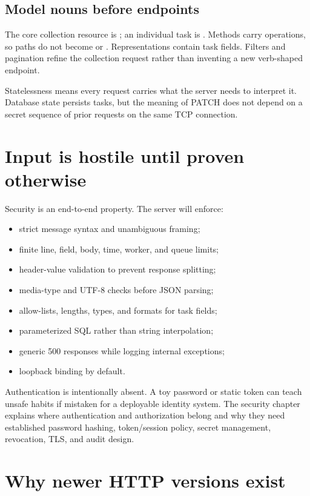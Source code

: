 \subsection{Model nouns before endpoints}

The core collection resource is ; an individual task is
. Methods carry operations, so paths do not become
 or . Representations contain task fields.
Filters and pagination refine the collection request rather than inventing a
new verb-shaped endpoint.

Statelessness means every request carries what the server needs to interpret it.
Database state persists tasks, but the meaning of PATCH does not depend on a
secret sequence of prior requests on the same TCP connection.

\section{Input is hostile until proven otherwise}

Security is an end-to-end property. The server will enforce:

\begin{itemize}
  \item strict message syntax and unambiguous framing;
  \item finite line, field, body, time, worker, and queue limits;
  \item header-value validation to prevent response splitting;
  \item media-type and UTF-8 checks before JSON parsing;
  \item allow-lists, lengths, types, and formats for task fields;
  \item parameterized SQL rather than string interpolation;
  \item generic 500 responses while logging internal exceptions;
  \item loopback binding by default.
\end{itemize}

Authentication is intentionally absent. A toy password or static token can
teach unsafe habits if mistaken for a deployable identity system. The security
chapter explains where authentication and authorization belong and why they
need established password hashing, token/session policy, secret management,
revocation, TLS, and audit design.

\section{Why newer HTTP versions exist}

